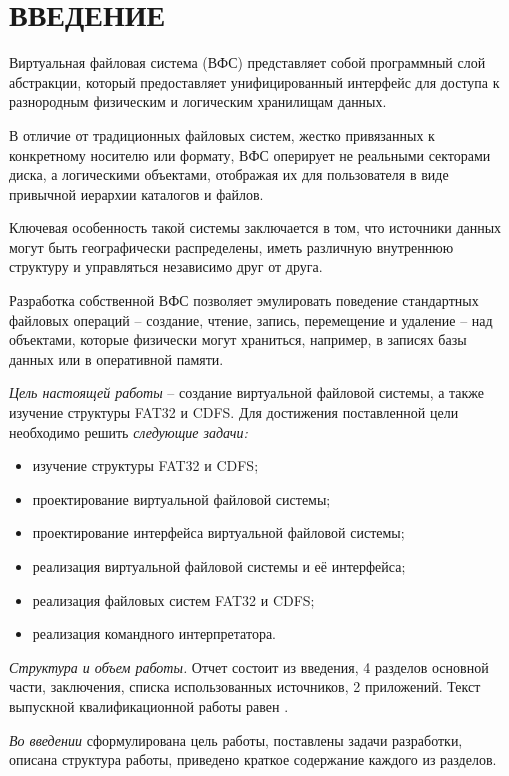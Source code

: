 \section*{ВВЕДЕНИЕ}
Виртуальная файловая система (ВФС) представляет собой программный слой абстракции, который предоставляет унифицированный интерфейс для доступа к разнородным физическим и логическим хранилищам данных.

В отличие от традиционных файловых систем, жестко привязанных к конкретному носителю или формату, ВФС оперирует не реальными секторами диска, а логическими объектами, отображая их для пользователя в виде привычной иерархии каталогов и файлов.

Ключевая особенность такой системы заключается в том, что источники данных могут быть географически распределены, иметь различную внутреннюю структуру и управляться независимо друг от друга.

Разработка собственной ВФС позволяет эмулировать поведение стандартных файловых операций -- создание, чтение, запись, перемещение и удаление -- над объектами, которые физически могут храниться, например, в записях базы данных или в оперативной памяти.

\emph{Цель настоящей работы} -- создание виртуальной файловой системы, а также изучение структуры FAT32 и CDFS. Для достижения поставленной цели необходимо решить \emph{следующие задачи:}
\begin{itemize}
\item изучение структуры FAT32 и CDFS;
\item проектирование виртуальной файловой системы;
\item проектирование интерфейса виртуальной файловой системы;
\item реализация виртуальной файловой системы и её интерфейса;
\item реализация файловых систем FAT32 и CDFS;
\item реализация командного интерпретатора.
\end{itemize}

\emph{Структура и объем работы.} Отчет состоит из введения, 4 разделов основной части, заключения, списка использованных источников, 2 приложений. Текст выпускной квалификационной работы равен .

\emph{Во введении} сформулирована цель работы, поставлены задачи разработки, описана структура работы, приведено краткое содержание каждого из разделов.

